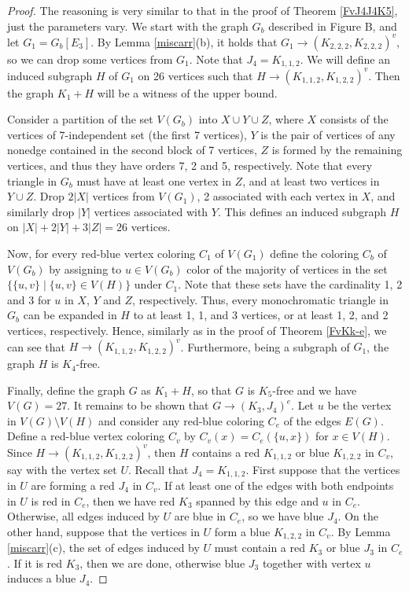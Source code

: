 \begin{proof}
The reasoning is very similar to that in the proof of
Theorem \ref{FvJ4J4K5}, just the parameters vary.
We start with the graph $G_b$ described in Figure B,
and let $G_1=G_b[E_3]$.
By Lemma \ref{miscarr}(b), it holds that
$G_1 \rightarrow (K_{2,2,2},K_{2,2,2})^v$,
so we can drop some vertices from $G_1$.
Note that $J_4=K_{1,1,2}$.
We will define an induced subgraph $H$ of $G_1$
on 26 vertices
such that $H \rightarrow (K_{1,1,2},K_{1,2,2})^v$.
Then the graph $K_1+H$ will be a witness
of the upper bound.

Consider a partition of the set $V(G_b)$ into
$X \cup Y \cup Z$, where
$X$ consists of the vertices of 7-independent set
(the first 7 vertices), $Y$ is the pair of vertices
of any nonedge contained in the second block of 7 vertices,
$Z$ is formed by the remaining vertices,
and thus they have orders 7, 2 and 5, respectively.
Note that every triangle in $G_b$ must have
at least one vertex in $Z$, and at least
two vertices in $Y \cup Z$.
Drop $2|X|$ vertices from $V(G_1)$, 2 associated with
each vertex in $X$, and similarly drop $|Y|$ vertices
associated with $Y$. This defines an induced
subgraph $H$ on $|X|+2|Y|+3|Z|=26$ vertices.

Now,
for every red-blue vertex coloring $C_1$ of $V(G_1)$
define the coloring $C_b$ of $V(G_b)$ by
assigning to $u \in V(G_b)$ color
of the majority of vertices in the set
$\bigl\{\{u,v\}\;|\;\{u,v\}\in V(H)\bigr\}$ under $C_1$.
Note that these sets have the cardinality 1, 2 and 3
for $u$ in $X$, $Y$ and $Z$, respectively.
Thus, every monochromatic triangle in $G_b$ can be
expanded in $H$ to at least 1, 1, and 3 vertices, or
at least 1, 2, and 2 vertices, respectively.
Hence, similarly as in the proof of
Theorem \ref{FvKk-e}, we can see that
$H \rightarrow (K_{1,1,2},K_{1,2,2})^v$. Furthermore,
being a subgraph of $G_1$, the graph $H$ is $K_4$-free.

Finally, define the graph $G$ as $K_1+H$,
so that $G$ is $K_5$-free and we have
$V(G)=27$. It remains to be shown that
$G \rightarrow (K_3,J_4)^e$.
Let $u$ be the vertex in $V(G) \setminus V(H)$
and consider any
red-blue coloring $C_e$ of the edges $E(G)$.
Define a red-blue vertex coloring $C_v$
by $C_v(x)=C_e(\{u,x\})$ for $x \in V(H)$.
Since $H \rightarrow (K_{1,1,2},K_{1,2,2})^v$,
then $H$ contains a red $K_{1,1,2}$ or blue
$K_{1,2,2}$ in $C_v$, say with the vertex set $U$.
Recall that $J_4=K_{1,1,2}$. 
First suppose that
the vertices in $U$ are forming a red $J_4$ in $C_v$.
If at least one of the edges with both endpoints
in $U$ is red in $C_e$, then we have red $K_3$
spanned by this edge and $u$ in $C_e$. Otherwise,
all edges induced by $U$ are blue in $C_e$, so we
have blue $J_4$. On the other hand, suppose that
the vertices in $U$ form a blue $K_{1,2,2}$ in $C_v$.
By Lemma \ref{miscarr}(c),
the set of edges induced by $U$ must contain
a red $K_3$ or blue $J_3$ in $C_e$.
If it is red $K_3$, then we are done, otherwise
blue $J_3$ together with vertex
$u$ induces a blue $J_4$.
\end{proof}

